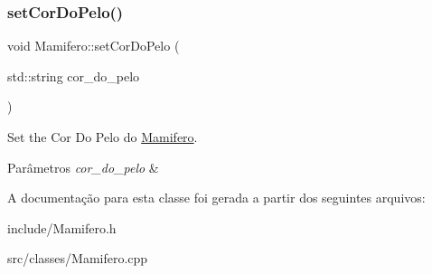\mbox{\label{classMamifero_af05676a74084b69250490febcff69751}} 
\subsubsection{\texorpdfstring{set\+Cor\+Do\+Pelo()}{setCorDoPelo()}}
{\footnotesize\ttfamily void Mamifero\+::set\+Cor\+Do\+Pelo (\begin{DoxyParamCaption}\item[{std\+::string}]{cor\+\_\+do\+\_\+pelo }\end{DoxyParamCaption})}



Set the Cor Do Pelo do \hyperlink{classMamifero}{Mamifero}. 


\begin{DoxyParams}{Parâmetros}
{\em cor\+\_\+do\+\_\+pelo} & \\
\hline
\end{DoxyParams}


A documentação para esta classe foi gerada a partir dos seguintes arquivos\+:\begin{DoxyCompactItemize}
\item 
include/Mamifero.\+h\item 
src/classes/Mamifero.\+cpp\end{DoxyCompactItemize}
